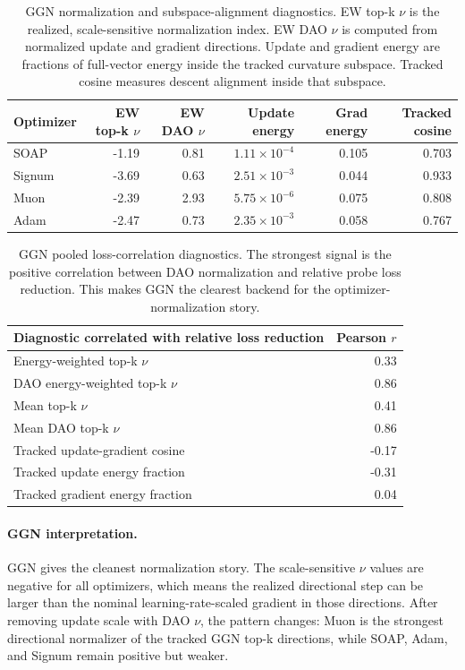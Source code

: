 \documentclass[11pt]{article}
\begin{document}
\begin{table}[htbp]
\centering
\small
\begin{tabular}{lrrrrr}
\toprule
Optimizer & EW top-k $\nu$ & EW DAO $\nu$ & Update energy & Grad energy & Tracked cosine \\
\midrule
SOAP & -1.19 & 0.81 & $1.11{\times}10^{-4}$ & 0.105 & 0.703 \\
Signum & -3.69 & 0.63 & $2.51{\times}10^{-3}$ & 0.044 & 0.933 \\
Muon & -2.39 & 2.93 & $5.75{\times}10^{-6}$ & 0.075 & 0.808 \\
Adam & -2.47 & 0.73 & $2.35{\times}10^{-3}$ & 0.058 & 0.767 \\
\bottomrule
\end{tabular}
\caption{GGN normalization and subspace-alignment diagnostics. EW top-k $\nu$ is the realized, scale-sensitive normalization index. EW DAO $\nu$ is computed from normalized update and gradient directions. Update and gradient energy are fractions of full-vector energy inside the tracked curvature subspace. Tracked cosine measures descent alignment inside that subspace.}
\label{tab:ggn-normalization}
\end{table}

\begin{table}[htbp]
\centering
\small
\begin{tabular}{lr}
\toprule
Diagnostic correlated with relative loss reduction & Pearson $r$ \\
\midrule
Energy-weighted top-k $\nu$ & 0.33 \\
DAO energy-weighted top-k $\nu$ & 0.86 \\
Mean top-k $\nu$ & 0.41 \\
Mean DAO top-k $\nu$ & 0.86 \\
Tracked update-gradient cosine & -0.17 \\
Tracked update energy fraction & -0.31 \\
Tracked gradient energy fraction & 0.04 \\
\bottomrule
\end{tabular}
\caption{GGN pooled loss-correlation diagnostics. The strongest signal is the positive correlation between DAO normalization and relative probe loss reduction. This makes GGN the clearest backend for the optimizer-normalization story.}
\label{tab:ggn-correlations}
\end{table}

\paragraph{GGN interpretation.}
GGN gives the cleanest normalization story. The scale-sensitive $\nu$ values are
negative for all optimizers, which means the realized directional step can be
larger than the nominal learning-rate-scaled gradient in those directions.
After removing update scale with DAO $\nu$, the pattern changes: Muon is the
strongest directional normalizer of the tracked GGN top-k directions, while
SOAP, Adam, and Signum remain positive but weaker.
\end{document}
